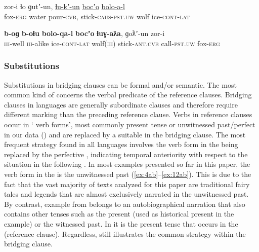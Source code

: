 \documentclass[output=paper]{LSP/langsci}
\begin{document}
\begin{exe}
	\ex	\label{ex:12ab}
	\begin{xlist}
		\ex	\label{ex:12a}
		\gll	zor-i		ɬo   		ɡutʼ-un, 			\underline{ɬu-kʼ-un}     			\underline{bocʼo} 	\underline{bolo-a-l}\\
			fox-\textsc{erg} 	water 	pour-\textsc{cvb}, 	stick-\textsc{caus-pst.uw} 	wolf   	ice-\textsc{cont-lat}\\
		\glt	{}

		\ex	\label{ex:12b}
		\gll		\textbf{b-oɡ}  		\textbf{b-oɬu}  	\textbf{bolo-qa-l}    	\textbf{bocʼo} 	\textbf{ɬuɣ-aƛa},  ɡoƛʼ-un    		zor-i \\
			\textsc{iii}-well 		\textsc{iii}-alike 	ice-\textsc{cont-lat}  	wolf(\textsc{iii})   	stick-\textsc{ant.cvb} call-\textsc{pst.uw} 		fox-\textsc{erg}  \\
		\glt	{} 
	\end{xlist}
\end{exe}



\subsubsection{Substitutions}
\label{ssec:Substitutions}
Substitutions in bridging clauses can be formal and/or semantic. The most common kind of  concerns the verbal predicate of the reference clauses. Bridging clauses in  languages are generally subordinate clauses and therefore require different marking than the preceding reference clause. Verbs in reference clauses occur in ` verb forms', most commonly present tense or unwitnessed past/perfect in our data () and are replaced by a suitable  in the bridging clause. The most frequent  strategy found in all  languages involves the verb form in the  being replaced by the perfective , indicating temporal anteriority with respect to the situation in the following . In most examples presented so far in this paper, the verb form in the  is the unwitnessed past (\ref{ex:4ab}--\ref{ex:12ab}). This is due to the fact that the vast majority of texts analyzed for this paper are traditional fairy tales and legends that are almost exclusively narrated in the unwitnessed past. By contrast, example  from  belongs to an autobiographical narration that also contains other tenses such as the present (used as historical present in the example) or the witnessed past. In  it is the present tense that occurs in the  (reference clause). Regardless,  still illustrates the common  strategy within the bridging clause.  
\end{document}

